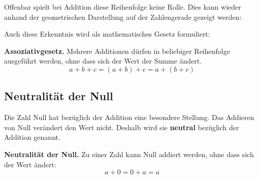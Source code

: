 Offenbar spielt bei Addition diese Reihenfolge keine Rolle. Dies kann wieder anhand der geometrischen Darstellung auf der Zahlengerade gezeigt werden:
\begin{center}
\end{center}
Auch diese Erkenntnis wird als mathematisches Gesetz formuliert:
\begin{theorem}
\textbf{Assoziativgesetz.} Mehrere Additionen dürfen in beliebiger Reihenfolge ausgeführt werden, ohne dass sich der Wert der Summe ändert.
\[
  a + b + c = (a + b) + c = a + (b + c)
\]
\end{theorem}

\subsection{Neutralität der Null}

Die Zahl Null hat bezüglich der Addition eine besondere Stellung. Das Addieren von Null verändert den Wert nicht. Deshalb wird sie \textbf{neutral} bezüglich der Addition genannt.
\begin{theorem}
  \textbf{Neutralität der Null.} Zu einer Zahl kann Null addiert werden, ohne dass sich der Wert ändert:
  \[
    a + 0 = 0 + a = a
  \]
\end{theorem}
